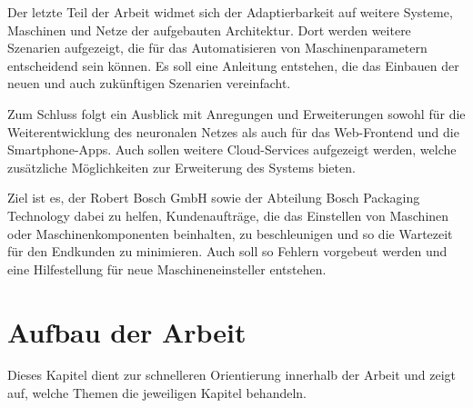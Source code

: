 Der letzte Teil der Arbeit widmet sich der Adaptierbarkeit auf weitere Systeme, Maschinen und Netze der aufgebauten
Architektur. Dort werden weitere Szenarien aufgezeigt, die für das Automatisieren von Maschinenparametern entscheidend
sein können. Es soll eine Anleitung entstehen, die das Einbauen der neuen und auch zukünftigen Szenarien vereinfacht.

Zum Schluss folgt ein Ausblick mit Anregungen und Erweiterungen sowohl für die Weiterentwicklung des neuronalen Netzes
als auch für das Web-Frontend und die Smartphone-Apps. Auch sollen weitere Cloud-Services aufgezeigt werden, welche
zusätzliche Möglichkeiten zur Erweiterung des Systems bieten.

Ziel ist es, der Robert Bosch GmbH sowie der Abteilung Bosch Packaging Technology dabei zu helfen, Kundenaufträge, die
das Einstellen von Maschinen oder Maschinenkomponenten beinhalten, zu beschleunigen und so die Wartezeit für den
Endkunden zu minimieren. Auch soll so Fehlern vorgebeut werden und eine Hilfestellung für neue Maschineneinsteller
entstehen.

\newpage

\section{Aufbau der Arbeit}
\label{sec:aufbauDerArbeit}
Dieses Kapitel dient zur schnelleren Orientierung innerhalb der Arbeit und zeigt auf, welche Themen die jeweiligen
Kapitel behandeln.

